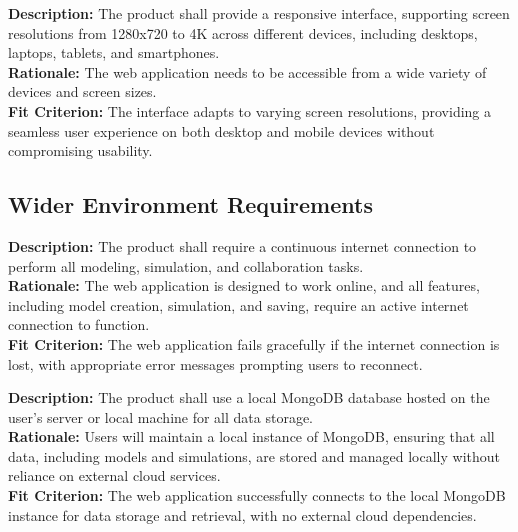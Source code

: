 \documentclass[12pt]{article}
\begin{document}
\vspace{0.5cm}

\begin{tcolorbox}[title=OEEP3]
\textbf{Description:} The product shall provide a responsive interface, supporting screen resolutions from 1280x720 to 4K across different devices, including desktops, laptops, tablets, and smartphones. \\
\textbf{Rationale:} The web application needs to be accessible from a wide variety of devices and screen sizes. \\
\textbf{Fit Criterion:} The interface adapts to varying screen resolutions, providing a seamless user experience on both desktop and mobile devices without compromising usability.
\end{tcolorbox}

\vspace{0.5cm}

\subsection{Wider Environment Requirements}

\begin{tcolorbox}[title=OEWE1]
\textbf{Description:} The product shall require a continuous internet connection to perform all modeling, simulation, and collaboration tasks. \\
\textbf{Rationale:} The web application is designed to work online, and all features, including model creation, simulation, and saving, require an active internet connection to function. \\
\textbf{Fit Criterion:} The web application fails gracefully if the internet connection is lost, with appropriate error messages prompting users to reconnect.
\end{tcolorbox}

\vspace{0.5cm}

\begin{tcolorbox}[title=OEWE2]
\textbf{Description:} The product shall use a local MongoDB database hosted on the user’s server or local machine for all data storage. \\
\textbf{Rationale:} Users will maintain a local instance of MongoDB, ensuring that all data, including models and simulations, are stored and managed locally without reliance on external cloud services. \\
\textbf{Fit Criterion:} The web application successfully connects to the local MongoDB instance for data storage and retrieval, with no external cloud dependencies.
\end{tcolorbox}
\end{document}
